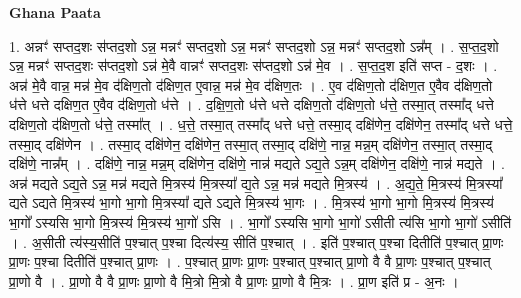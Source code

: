 \documentclass[17pt]{extarticle}
\begin{document}
\textbf{Ghana Paata } \newline

1. अन्नꣳ॑ सप्तद॒शः स॑प्तद॒शो ऽन्न॒ मन्नꣳ॑ सप्तद॒शो ऽन्न॒ मन्नꣳ॑ सप्तद॒शो ऽन्न॒ मन्नꣳ॑ सप्तद॒शो ऽन्न᳚म् । . स॒प्त॒द॒शो ऽन्न॒ मन्नꣳ॑ सप्तद॒शः स॑प्तद॒शो ऽन्न॑ मे॒वै वान्नꣳ॑ सप्तद॒शः स॑प्तद॒शो ऽन्न॑ मे॒व । . स॒प्त॒द॒श इति॑ सप्त - द॒शः । . अन्न॑ मे॒वै वान्न॒ मन्न॑ मे॒व द॑क्षिण॒तो द॑क्षिण॒त ए॒वान्न॒ मन्न॑ मे॒व द॑क्षिण॒तः । . ए॒व द॑क्षिण॒तो द॑क्षिण॒त ए॒वैव द॑क्षिण॒तो ध॑त्ते धत्ते दक्षिण॒त ए॒वैव द॑क्षिण॒तो ध॑त्ते । . द॒क्षि॒ण॒तो ध॑त्ते धत्ते दक्षिण॒तो द॑क्षिण॒तो ध॑त्ते॒ तस्मा॒त् तस्मा᳚द् धत्ते दक्षिण॒तो द॑क्षिण॒तो ध॑त्ते॒ तस्मा᳚त् । . ध॒त्ते॒ तस्मा॒त् तस्मा᳚द् धत्ते धत्ते॒ तस्मा॒द् दक्षि॑णेन॒ दक्षि॑णेन॒ तस्मा᳚द् धत्ते धत्ते॒ तस्मा॒द् दक्षि॑णेन । . तस्मा॒द् दक्षि॑णेन॒ दक्षि॑णेन॒ तस्मा॒त् तस्मा॒द् दक्षि॑णे॒ नान्न॒ मन्न॒म् दक्षि॑णेन॒ तस्मा॒त् तस्मा॒द् दक्षि॑णे॒ नान्न᳚म् । . दक्षि॑णे॒ नान्न॒ मन्न॒म् दक्षि॑णेन॒ दक्षि॑णे॒ नान्न॑ मद्यते ऽद्य॒ते ऽन्न॒म् दक्षि॑णेन॒ दक्षि॑णे॒ नान्न॑ मद्यते । . अन्न॑ मद्यते ऽद्य॒ते ऽन्न॒ मन्न॑ मद्यते मि॒त्रस्य॑ मि॒त्रस्या᳚ द्य॒ते ऽन्न॒ मन्न॑ मद्यते मि॒त्रस्य॑ । . अ॒द्य॒ते॒ मि॒त्रस्य॑ मि॒त्रस्या᳚ द्यते ऽद्यते मि॒त्रस्य॑ भा॒गो भा॒गो मि॒त्रस्या᳚ द्यते ऽद्यते मि॒त्रस्य॑ भा॒गः । . मि॒त्रस्य॑ भा॒गो भा॒गो मि॒त्रस्य॑ मि॒त्रस्य॑ भा॒गो᳚ ऽस्यसि भा॒गो मि॒त्रस्य॑ मि॒त्रस्य॑ भा॒गो॑ ऽसि । . भा॒गो᳚ ऽस्यसि भा॒गो भा॒गो॑ ऽसीती त्य॑सि भा॒गो भा॒गो॑ ऽसीति॑ । . अ॒सीती त्य॑स्य॒सीति॑ प॒श्चात् प॒श्चा दित्य॑स्य॒ सीति॑ प॒श्चात् । . इति॑ प॒श्चात् प॒श्चा दितीति॑ प॒श्चात् प्रा॒णः प्रा॒णः प॒श्चा दितीति॑ प॒श्चात् प्रा॒णः । . प॒श्चात् प्रा॒णः प्रा॒णः प॒श्चात् प॒श्चात् प्रा॒णो वै वै प्रा॒णः प॒श्चात् प॒श्चात् प्रा॒णो वै । . प्रा॒णो वै वै प्रा॒णः प्रा॒णो वै मि॒त्रो मि॒त्रो वै प्रा॒णः प्रा॒णो वै मि॒त्रः । . प्रा॒ण इति॑ प्र - अ॒नः । \newline
\end{document}
